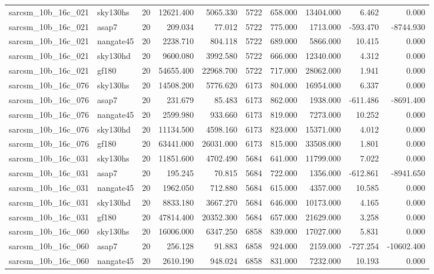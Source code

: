 \begin{longtable}{llrrrrrrrr}
sarcsm\_10b\_16c\_021 & sky130hs & 20 & 12621.400 & 5065.330 & 5722 & 658.000 & 13404.000 & 6.462 & 0.000 \\
sarcsm\_10b\_16c\_021 & asap7 & 20 & 209.034 & 77.012 & 5722 & 775.000 & 1713.000 & -593.470 & -8744.930 \\
sarcsm\_10b\_16c\_021 & nangate45 & 20 & 2238.710 & 804.118 & 5722 & 689.000 & 5866.000 & 10.415 & 0.000 \\
sarcsm\_10b\_16c\_021 & sky130hd & 20 & 9600.080 & 3992.580 & 5722 & 666.000 & 12340.000 & 4.312 & 0.000 \\
sarcsm\_10b\_16c\_021 & gf180 & 20 & 54655.400 & 22968.700 & 5722 & 717.000 & 28062.000 & 1.941 & 0.000 \\
sarcsm\_10b\_16c\_076 & sky130hs & 20 & 14508.200 & 5776.620 & 6173 & 804.000 & 16954.000 & 6.337 & 0.000 \\
sarcsm\_10b\_16c\_076 & asap7 & 20 & 231.679 & 85.483 & 6173 & 862.000 & 1938.000 & -611.486 & -8691.400 \\
sarcsm\_10b\_16c\_076 & nangate45 & 20 & 2599.980 & 933.660 & 6173 & 819.000 & 7273.000 & 10.252 & 0.000 \\
sarcsm\_10b\_16c\_076 & sky130hd & 20 & 11134.500 & 4598.160 & 6173 & 823.000 & 15371.000 & 4.012 & 0.000 \\
sarcsm\_10b\_16c\_076 & gf180 & 20 & 63441.000 & 26031.000 & 6173 & 815.000 & 33508.000 & 1.801 & 0.000 \\
sarcsm\_10b\_16c\_031 & sky130hs & 20 & 11851.600 & 4702.490 & 5684 & 641.000 & 11799.000 & 7.022 & 0.000 \\
sarcsm\_10b\_16c\_031 & asap7 & 20 & 195.245 & 70.815 & 5684 & 722.000 & 1356.000 & -612.861 & -8941.650 \\
sarcsm\_10b\_16c\_031 & nangate45 & 20 & 1962.050 & 712.880 & 5684 & 615.000 & 4357.000 & 10.585 & 0.000 \\
sarcsm\_10b\_16c\_031 & sky130hd & 20 & 8833.180 & 3667.270 & 5684 & 646.000 & 10173.000 & 4.165 & 0.000 \\
sarcsm\_10b\_16c\_031 & gf180 & 20 & 47814.400 & 20352.300 & 5684 & 657.000 & 21629.000 & 3.258 & 0.000 \\
sarcsm\_10b\_16c\_060 & sky130hs & 20 & 16006.000 & 6347.250 & 6858 & 839.000 & 17027.000 & 5.831 & 0.000 \\
sarcsm\_10b\_16c\_060 & asap7 & 20 & 256.128 & 91.883 & 6858 & 924.000 & 2159.000 & -727.254 & -10602.400 \\
sarcsm\_10b\_16c\_060 & nangate45 & 20 & 2610.190 & 948.024 & 6858 & 831.000 & 7232.000 & 10.193 & 0.000 \\

\end{longtable}

